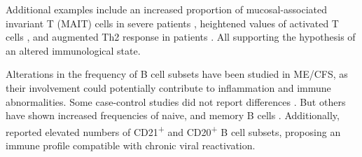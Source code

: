 Additional examples include an increased proportion of mucosal-associated invariant \cdeight T (MAIT) cells in severe patients \citep{cliff2019CellularImmune}, heightened values of activated \cdeight T cells \citep{landay1991ChronicFatigue}, and augmented Th2 response in patients \citep{ruiz-pablos2021EpsteinBarrVirus}.
All supporting the hypothesis of an altered immunological state.


Alterations in the frequency of B cell subsets have been studied in ME/CFS, as their involvement could potentially contribute to inflammation and immune abnormalities.
Some case-control studies did not report differences \citep{curriu2013ScreeningNK, bradley2013AlteredFunctional, mensah2016ExtendedCell}.
But others have shown increased frequencies of naive, and memory B cells \citep{brenu2014RoleAdaptive, ono2017DysregulationCells}.
Additionally, \citet{klimas1990ImmunologicAbnormalitiesa} reported elevated numbers of CD21\textsuperscript{+} and CD20\textsuperscript{+} B cell subsets, proposing an immune profile compatible with chronic viral reactivation.


